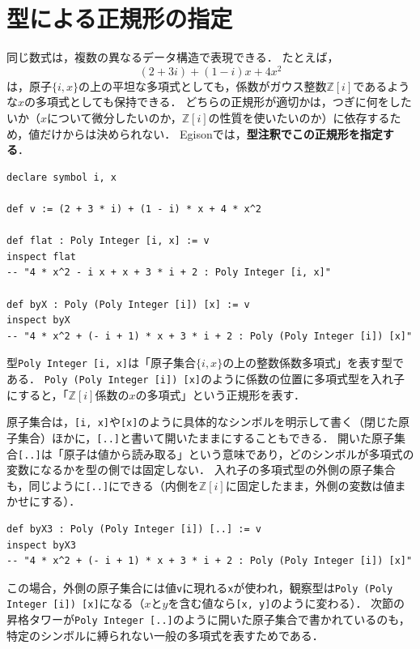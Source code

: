 \section{型による正規形の指定}\label{cas-tower}

同じ数式は，複数の異なるデータ構造で表現できる．
たとえば，
\[ (2+3i) + (1-i)x + 4x^2 \]
は，原子$\{i, x\}$の上の平坦な多項式としても，係数がガウス整数$\mathbb{Z}[i]$であるような$x$の多項式としても保持できる．
どちらの正規形が適切かは，つぎに何をしたいか（$x$について微分したいのか，$\mathbb{Z}[i]$の性質を使いたいのか）に依存するため，値だけからは決められない．
Egisonでは，\textbf{型注釈でこの正規形を指定する}．
\begin{lstlisting}[language=egison,numbers=none]
declare symbol i, x

def v := (2 + 3 * i) + (1 - i) * x + 4 * x^2

def flat : Poly Integer [i, x] := v
inspect flat
-- "4 * x^2 - i x + x + 3 * i + 2 : Poly Integer [i, x]"

def byX : Poly (Poly Integer [i]) [x] := v
inspect byX
-- "4 * x^2 + (- i + 1) * x + 3 * i + 2 : Poly (Poly Integer [i]) [x]"
\end{lstlisting}
型\lstinline{Poly Integer [i, x]}は「原子集合$\{i, x\}$の上の整数係数多項式」を表す型である．
\lstinline{Poly (Poly Integer [i]) [x]}のように係数の位置に多項式型を入れ子にすると，「$\mathbb{Z}[i]$係数の$x$の多項式」という正規形を表す．

原子集合は，\lstinline{[i, x]}や\lstinline{[x]}のように具体的なシンボルを明示して書く（閉じた原子集合）ほかに，\lstinline{[..]}と書いて開いたままにすることもできる．
開いた原子集合\lstinline{[..]}は「原子は値から読み取る」という意味であり，どのシンボルが多項式の変数になるかを型の側では固定しない．
入れ子の多項式型の外側の原子集合も，同じように\lstinline{[..]}にできる（内側を$\mathbb{Z}[i]$に固定したまま，外側の変数は値まかせにする）．
\begin{lstlisting}[language=egison,numbers=none]
def byX3 : Poly (Poly Integer [i]) [..] := v
inspect byX3
-- "4 * x^2 + (- i + 1) * x + 3 * i + 2 : Poly (Poly Integer [i]) [x]"
\end{lstlisting}
この場合，外側の原子集合には値\lstinline{v}に現れる\lstinline{x}が使われ，観察型は\lstinline{Poly (Poly Integer [i]) [x]}になる（$x$と$y$を含む値なら\lstinline{[x, y]}のように変わる）．
次節の昇格タワーが\lstinline{Poly Integer [..]}のように開いた原子集合で書かれているのも，特定のシンボルに縛られない一般の多項式を表すためである．

